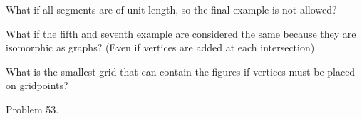 \documentclass{article}
\begin{document}
\begin{related}
  \item What if all segments are of unit length, so the final example is not
    allowed?
  \item What if the fifth and seventh example are considered the same because
    they are isomorphic as graphs? (Even if vertices are added at each
    intersection)
  \item What is the smallest grid that can contain the figures if vertices
    must be placed on gridpoints?
\end{related}
\begin{references}
  \item Problem 53.
\end{references}
\end{document}
